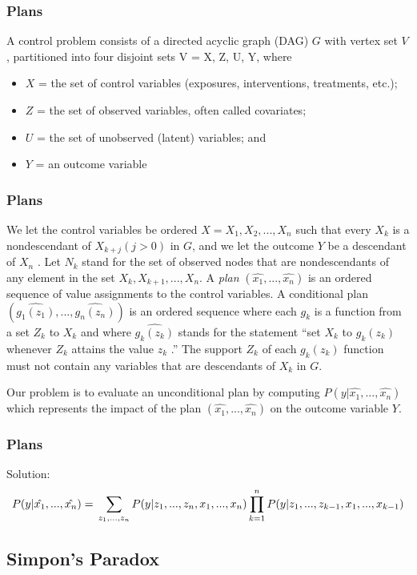 \documentclass{beamer}
\begin{document}
\begin{frame}
\frametitle{Plans}
\begin{definition}
A control problem consists of a directed acyclic graph
(DAG) $G$ with vertex set $V$, partitioned into four disjoint
sets V = {X, Z, U, Y}, where
\begin{itemize}
\item $X$ = the set of control variables (exposures,
interventions, treatments, etc.);
\item $Z$ = the set of observed variables, often called
covariates;
\item $U$ = the set of unobserved (latent) variables; and
\item $Y$ = an outcome variable
\end{itemize}
\end{definition}
\end{frame}

\begin{frame}
\frametitle{Plans}
We let the control variables be ordered $X = X_1 , X _2 ,...,
X_n$ such that every $X_k$ is a nondescendant of $X_{k + j} (j > 0)$ in
$G$, and we let the outcome $Y$ be a descendant of $X_n$ . Let $N_k$
stand for the set of observed nodes that are
nondescendants of any element in the set {$X_k , X_{k + 1}, ...,
X_n $}. A \emph{plan} $(\hat{x_1},...,\hat{x_n})$ is an ordered sequence
of value assignments to the control variables. 
A conditional plan $(\hat{g_1(z_1)},...,\hat{g_n(z_n)})$ is an ordered sequence
where each $g_k$ is a function from a
set $Z_k$ to $X_k$ and where $\hat{g_k(z_k)}$
stands for the statement “set
$X_k$ to $g_k(z_k)$ whenever $Z_k$ attains the value $z_k$ .” The
support $Z_k$ of each $g_k(z_k )$ function must not contain any
variables that are descendants of $X_k$ in $G$.


Our problem is to evaluate an unconditional plan  by
computing $P(y|\hat{x_1},...,\hat{x_n})$
which represents the impact of
the plan $(\hat{x_1},...,\hat{x_n})$
on the outcome variable $Y$.
\end{frame}


\begin{frame}
\frametitle{Plans}
Solution:\\
$$
P(y|\hat{x_1},...,\hat{x_n}) =\\
 \sum_{z_1,...,z_n} P(y|z_1,...,z_n,x_1,...,x_n)\prod_{k=1}^n P(y|z_1,...,z_{k-1},x_1,...,x_{k-1})
$$
\end{frame}

\subsection{Simpon's Paradox}
\end{document}
